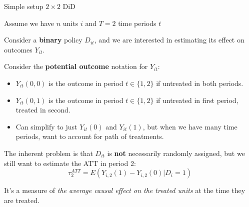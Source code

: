 \documentclass[notes,11pt, aspectratio=169]{beamer}
\newenvironment{wideitemize}{\itemize\addtolength{\itemsep}{10pt}}{\enditemize}
\begin{document}
\begin{frame}{Simple setup $2\times 2$ DiD }
  \begin{wideitemize}
  \item Assume we have $n$ units $i$ and $T=2$ time periods $t$ 
  \item Consider a \textbf{binary} policy $D_{it}$, and we are interested in estimating its effect on outcomes $Y_{it}$.
  \item Consider the \textbf{potential outcome} notation for $Y_{it}$:
    \begin{itemize}
    \item $Y_{it}(0,0)$ is the outcome in period $t\in \{1,2\}$ if untreated in both periods.
    \item $Y_{it}(0,1)$ is the outcome in period $t\in \{1,2\}$ if
      untreated in first period, treated in second.
    \item Can simplify to just $Y_{it}(0)$ and $Y_{it}(1)$, but when
      we have many time periods, want to account for path of treatments.
    \end{itemize}
  \item The inherent problem is that $D_{it}$ is \textbf{not}
    necessarily randomly assigned, but we still want to estimate the ATT in period 2:
    \begin{equation*}
      \tau_{2}^{ATT} = E(Y_{i,2}(1) - Y_{i,2}(0) | D_{i} = 1)
    \end{equation*}
    \item It's a measure of \textit{the average causal effect on the treated units} at the time they are treated. 
  \end{wideitemize}
\end{frame}
\end{document}
